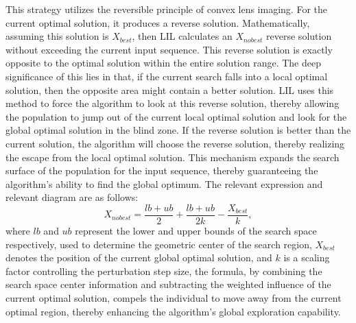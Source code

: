 \documentclass[conference]{{IEEEtran}}
\begin{document}
This strategy utilizes the reversible principle of convex lens imaging. For the current optimal solution, it produces a reverse solution\cite{bresson2024kagnns}. Mathematically, assuming this solution is $X_{best}$, then LIL calculates an $X_{nobest}$ reverse solution without exceeding the current input sequence. This reverse solution is exactly opposite to the optimal solution within the entire solution range. The deep significance of this lies in that, if the current search falls into a local optimal solution, then the opposite area might contain a better solution. LIL uses this method to force the algorithm to look at this reverse solution, thereby allowing the population to jump out of the current local optimal solution and look for the global optimal solution in the blind zone\cite{noorizadegan2025practitioner}. If the reverse solution is better than the current solution, the algorithm will choose the reverse solution, thereby realizing the escape from the local optimal solution. This mechanism expands the search surface of the population for the input sequence, thereby guaranteeing the algorithm's ability to find the global optimum. The relevant expression and relevant diagram are as follows:\begin{equation}
    X_{nobest} = \frac{lb + ub}{2} + \frac{lb + ub}{2k} - \frac{X_{best}}{k},
    \label{eq:lil_opposition}
\end{equation}where $lb$ and $ub$ represent the lower and upper bounds of the search space respectively, used to determine the geometric center of the search region, $X_{best}$ denotes the position of the current global optimal solution, and $k$ is a scaling factor controlling the perturbation step size, the formula, by combining the search space center information and subtracting the weighted influence of the current optimal solution, compels the individual to move away from the current optimal region, thereby enhancing the algorithm's global exploration capability.
\end{document}
